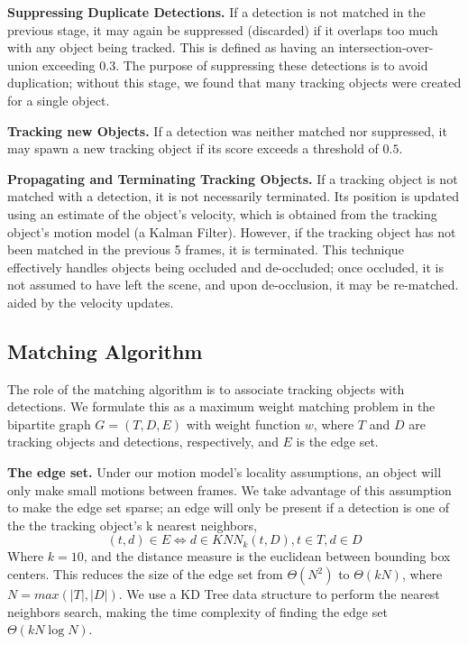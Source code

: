 \documentclass[10pt,twocolumn,letterpaper]{article}
\begin{document}
\textbf{Suppressing Duplicate Detections.}
If a detection is not matched in the previous stage, it may again be suppressed (discarded) if it overlaps too much with any object being tracked.
This is defined as having an intersection-over-union exceeding $0.3$.
The purpose of suppressing these detections is to avoid duplication; without this stage, we found that many tracking objects were created for a single object.

\textbf{Tracking new Objects.}
If a detection was neither matched nor suppressed, it may spawn a new tracking object if its score exceeds a threshold of $0.5$.


\textbf{Propagating and Terminating Tracking Objects.}
If a tracking object is not matched with a detection, it is not necessarily terminated.
Its position is updated using an estimate of the object's velocity, which is obtained from the tracking object's motion model (a Kalman Filter).
However, if the tracking object has not been matched in the previous 5 frames, it is terminated.
This technique effectively handles objects being occluded and de-occluded; once occluded, it is not assumed to have left the scene, and upon de-occlusion, it may be re-matched.
 aided by the velocity updates.

\label{matching_algo_subsection}
\subsection{Matching Algorithm}
The role of the matching algorithm is to associate tracking objects with detections.
We formulate this as a maximum weight matching problem in the bipartite graph $G= (T,D,E)$ with weight function $w$, where $T$ and $D$ are tracking objects and detections, respectively, and $E$ is the edge set.



\textbf{The edge set.}
Under our motion model's locality assumptions, an object will only make small motions between frames.
We take advantage of this assumption to make the edge set sparse; an edge will only be present if a detection is one of the the tracking object's k nearest neighbors,
$$(t,d) \in E \iff d \in KNN_k(t, D), t\in T, d\in D$$
Where $k=10$, and the distance measure is the euclidean between bounding box centers.
This reduces the size of the edge set from $\Theta(N^2)$ to $\Theta(kN)$, where $N = max(\vert T \vert, \vert D \vert)$.
We use a KD Tree data structure \cite{kdtree_1975} to perform the nearest neighbors search, making the time complexity of finding the edge set $\Theta(kN \log N)$.
\end{document}
